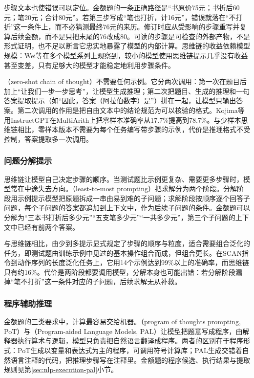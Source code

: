 步骤文本也使错误可以定位。金额题的一条正确路径是“书原价75元；书折后60元；笔20元；合计80元”。若第三步写成“笔也打折，计16元”，错误就落在“不打折”这一条件上，而不必猜测最终76元的来历。修订时应从受影响的步骤重写并复算后续金额，而不是只把末尾的76改成80。可读的步骤是可检查的外部产物，不是形式证明，也不足以断言它忠实地暴露了模型的内部计算。思维链的收益依赖模型规模：Wei等在多个模型系列上观察到，较小的模型使用思维链提示几乎没有收益甚至变差，只有足够大的模型才能稳定地利用步骤条件。

（zero-shot chain of thought）不需要任何示例。它分两次调用：第一次在题目后加上“让我们一步一步思考”，让模型生成推理；第二次把题目、生成的推理和一句答案提取提示（如“因此，答案（阿拉伯数字）是”）拼在一起，让模型只输出答案。第二次调用的作用是把自由文本中的结论规范为可以核验的格式。Kojima等用InstructGPT在MultiArith上把零样本准确率从17.7\%提高到78.7\%。与少样本思维链相比，零样本版本不需要为每个任务编写带步骤的示例，代价是推理格式不受控制，答案提取多一次调用。

\subsubsection{问题分解提示}
\label{sec:nlp-reasoning-least-to-most}

思维链让模型自己决定步骤的顺序。当测试题比示例更复杂、需要更多步骤时，模型常在中途失去方向。（least-to-most prompting）把求解分为两个阶段。分解阶段用示例提示模型把原题拆成一串由易到难的子问题；求解阶段按顺序逐个回答子问题，每个子问题的答案都追加到上下文中，作为后续子问题的条件。金额题可以分解为“三本书打折后多少元”“五支笔多少元”“一共多少元”，第三个子问题的上下文中已经有前两个答案。

与思维链相比，由少到多提示显式规定了步骤的顺序与粒度，适合需要组合泛化的任务，即测试题由训练示例中见过的基本操作组合而成，但组合更长。在SCAN指令到动作序列的长度泛化任务上，它用14个示例达到99\%以上的准确率，而思维链只有约16\%。代价是两阶段都要调用模型，分解本身也可能出错：若分解阶段漏掉“笔不打折”这一条件对应的子问题，后续求解无从补救。

\subsubsection{程序辅助推理}
\label{sec:nlp-reasoning-program-aided}

金额题的三类要求中，计算最容易交给机器。（program of thoughts prompting, PoT）与（Program-aided Language Models, PAL）让模型把题意写成程序，由解释器执行算术与逻辑，模型只负责把自然语言翻译成程序。两者的区别在于程序形式：PoT生成以变量和表达式为主的程序，可调用符号计算库；PAL生成交错着自然语言注释的代码，把推理步骤写在注释里。金额题的程序候选、执行结果与提取规则见第\ref{sec:nlp-execution-pal}小节。

